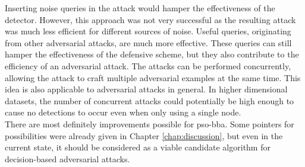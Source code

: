 Inserting noise queries in the attack would hamper the effectiveness of the detector. However, this approach was not very successful as the resulting attack was much less efficient for different sources of noise. Useful queries, originating from other adversarial attacks, are much more effective. These queries can still hamper the effectiveness of the defensive scheme, but they also contribute to the efficiency of an adversarial attack. The attacks can be performed concurrently, allowing the attack to craft multiple adversarial examples at the same time. This idea is also applicable to adversarial attacks in general. In higher dimensional datasets, the number of concurrent attacks could potentially be high enough to cause no detections to occur even when only using a single node.\\

There are most definitely improvements possible for \gls{pso}-\gls{bba}. Some pointers for possibilities were already given in Chapter \ref{chap:discussion}, but even in the current state, it should be considered as a viable candidate algorithm for decision-based adversarial attacks.